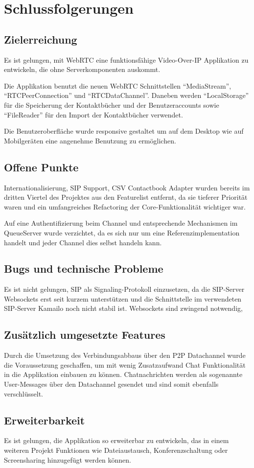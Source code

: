 \chapter{Schlussfolgerungen}
	\section{Zielerreichung}
		Es ist gelungen, mit WebRTC eine funktionsfähige Video-Over-IP Applikation zu entwickeln, die ohne Serverkomponenten auskommt.
		
		Die Applikation benutzt die neuen WebRTC Schnittstellen "`MediaStream"', "`RTCPeerConnection"' und "`RTCDataChannel"'. Daneben werden "`LocalStorage"' für die Speicherung der Kontaktbücher und der Benutzeraccounts sowie "`FileReader"' für den Import der Kontaktbücher verwendet.
		
		Die Benutzeroberfläche wurde responsive gestaltet um auf dem Desktop wie auf Mobilgeräten eine angenehme Benutzung zu ermöglichen.
	
	
	\section{Offene Punkte}
		Internationalisierung, SIP Support, CSV Contactbook Adapter wurden bereits im dritten Viertel des Projektes aus den Featurelist entfernt, da sie tieferer Priorität waren und ein umfangreiches Refactoring der Core-Funktionalität wichtiger war.
		
		Auf eine Authentifizierung beim Channel und entsprechende Mechanismen im QueueServer wurde verzichtet, da es sich nur um eine Referenzimplementation handelt und jeder Channel dies selbst handeln kann.
		
	
	\section{Bugs und technische Probleme}
		Es ist nicht gelungen, SIP als Signaling-Protokoll einzusetzen, da die SIP-Server Websockets erst seit kurzem unterstützen und die Schnittstelle im verwendeten SIP-Server Kamailo noch nicht stabil ist. Websockets sind zwingend notwendig,
		
	
	\section{Zusätzlich umgesetzte Features}
		Durch die Umsetzung des Verbindungsabbaus über den P2P Datachannel wurde die Voraussetzung geschaffen, um mit wenig Zusatzaufwand Chat Funktionalität in die Applikation einbauen zu können.
		Chatnachrichten werden als sogenannte User-Messages über den Datachannel gesendet und sind somit ebenfalls verschlüsselt.
		
	
	\section{Erweiterbarkeit}
		Es ist gelungen, die Applikation so erweiterbar zu entwickeln, das in einem weiteren Projekt Funktionen wie Dateiaustausch, Konferenzschaltung oder Screensharing hinzugefügt werden können.